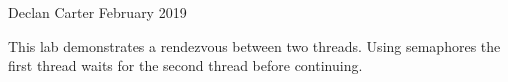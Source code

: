 Declan Carter February 2019

This lab demonstrates a rendezvous between two threads. Using semaphores the first thread waits for the second thread before continuing. 